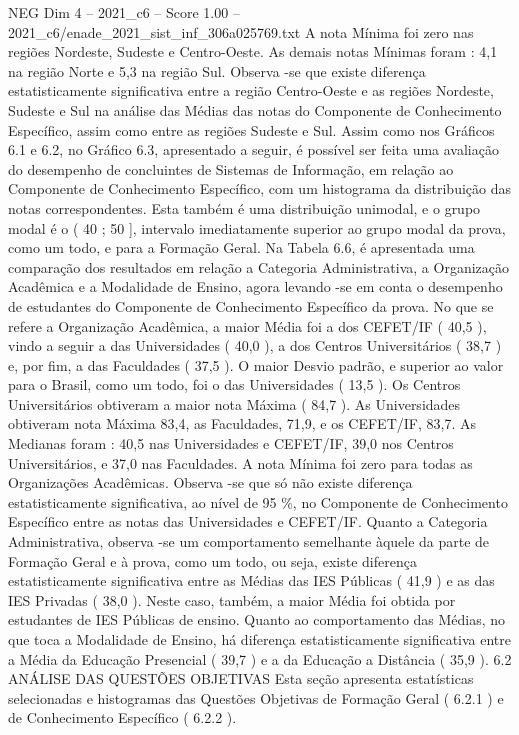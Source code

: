 \begin{textsample}{NEG Dim 4 – 2021\_c6 – Score 1.00 – 2021\_c6/enade\_2021\_sist\_inf\_306a025769.txt}
A nota Mínima foi zero nas regiões Nordeste, Sudeste e Centro-Oeste.
As demais notas Mínimas foram : 4,1 na região Norte e 5,3 na região Sul.
Observa -se que existe diferença estatisticamente significativa entre a região Centro-Oeste e as regiões Nordeste, Sudeste e Sul na análise das Médias das notas do Componente de Conhecimento Específico, assim como entre as regiões Sudeste e Sul.
Assim como nos Gráficos 6.1 e 6.2, no Gráfico 6.3, apresentado a seguir, é possível ser feita uma avaliação do desempenho de concluintes de Sistemas de Informação, em relação ao Componente de Conhecimento Específico, com um histograma da distribuição das notas correspondentes.
Esta também é uma distribuição unimodal, e o grupo modal é o ( 40 ; 50 ], intervalo imediatamente superior ao grupo modal da prova, como um todo, e para a Formação Geral.
Na Tabela 6.6, é apresentada uma comparação dos resultados em relação a Categoria Administrativa, a Organização Acadêmica e a Modalidade de Ensino, agora levando -se em conta o desempenho de estudantes do Componente de Conhecimento Específico da prova.
No que se refere a Organização Acadêmica, a maior Média foi a dos CEFET/IF ( 40,5 ), vindo a seguir a das Universidades ( 40,0 ), a dos Centros Universitários ( 38,7 ) e, por fim, a das Faculdades ( 37,5 ).
O maior Desvio padrão, e superior ao valor para o Brasil, como um todo, foi o das Universidades ( 13,5 ).
Os Centros Universitários obtiveram a maior nota Máxima ( 84,7 ).
As Universidades obtiveram nota Máxima 83,4, as Faculdades, 71,9, e os CEFET/IF, 83,7.
As Medianas foram : 40,5 nas Universidades e CEFET/IF, 39,0 nos Centros Universitários, e 37,0 nas Faculdades.
A nota Mínima foi zero para todas as Organizações Acadêmicas.
Observa -se que só não existe diferença estatisticamente significativa, ao nível de 95 \%, no Componente de Conhecimento Específico entre as notas das Universidades e CEFET/IF.
Quanto a Categoria Administrativa, observa -se um comportamento semelhante àquele da parte de Formação Geral e à prova, como um todo, ou seja, existe diferença estatisticamente significativa entre as Médias das IES Públicas ( 41,9 ) e as das IES Privadas ( 38,0 ).
Neste caso, também, a maior Média foi obtida por estudantes de IES Públicas de ensino.
Quanto ao comportamento das Médias, no que toca a Modalidade de Ensino, há diferença estatisticamente significativa entre a Média da Educação Presencial ( 39,7 ) e a da Educação a Distância ( 35,9 ). 6.2 ANÁLISE DAS QUESTÕES OBJETIVAS Esta seção apresenta estatísticas selecionadas e histogramas das Questões Objetivas de Formação Geral ( 6.2.1 ) e de Conhecimento Específico ( 6.2.2 ).

\end{textsample}
